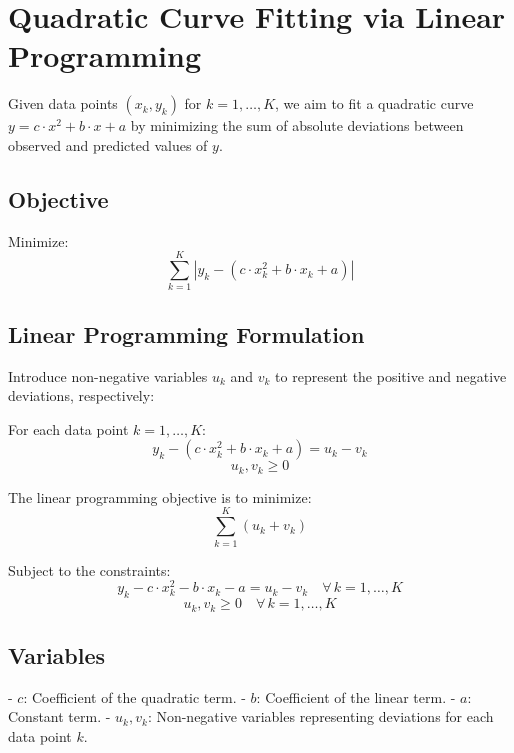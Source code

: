 \documentclass{article}
\begin{document}
\section*{Quadratic Curve Fitting via Linear Programming}

Given data points \((x_k, y_k)\) for \(k = 1, \ldots, K\), we aim to fit a quadratic curve \( y = c \cdot x^2 + b \cdot x + a \) by minimizing the sum of absolute deviations between observed and predicted values of \( y \).

\subsection*{Objective}

Minimize:
\[
\sum_{k=1}^K |y_k - (c \cdot x_k^2 + b \cdot x_k + a)|
\]

\subsection*{Linear Programming Formulation}

Introduce non-negative variables \( u_k \) and \( v_k \) to represent the positive and negative deviations, respectively:

For each data point \( k = 1, \ldots, K \):
\[
y_k - (c \cdot x_k^2 + b \cdot x_k + a) = u_k - v_k
\]
\[ 
u_k, v_k \geq 0
\]

The linear programming objective is to minimize:
\[
\sum_{k=1}^K (u_k + v_k)
\]

Subject to the constraints:
\[
y_k - c \cdot x_k^2 - b \cdot x_k - a = u_k - v_k \quad \forall \, k = 1, \ldots, K
\]
\[
u_k, v_k \geq 0 \quad \forall \, k = 1, \ldots, K
\]

\subsection*{Variables}

- \( c \): Coefficient of the quadratic term.
- \( b \): Coefficient of the linear term.
- \( a \): Constant term.
- \( u_k, v_k \): Non-negative variables representing deviations for each data point \( k \).
\end{document}
